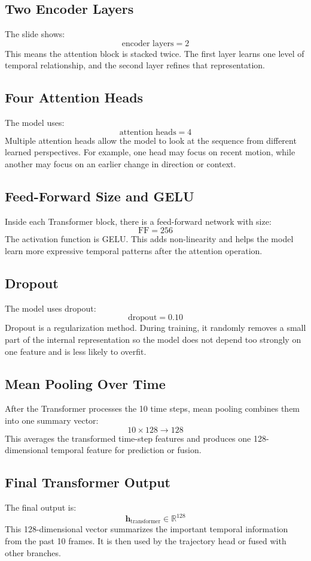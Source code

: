 \documentclass[11pt,a4paper]{article}
\begin{document}
\subsection*{Two Encoder Layers}
The slide shows:
\[
    \text{encoder layers} = 2
\]
This means the attention block is stacked twice. The first layer learns one
level of temporal relationship, and the second layer refines that representation.

\subsection*{Four Attention Heads}
The model uses:
\[
    \text{attention heads} = 4
\]
Multiple attention heads allow the model to look at the sequence from different
learned perspectives. For example, one head may focus on recent motion, while
another may focus on an earlier change in direction or context.

\subsection*{Feed-Forward Size and GELU}
Inside each Transformer block, there is a feed-forward network with size:
\[
    \text{FF} = 256
\]
The activation function is GELU. This adds non-linearity and helps the model
learn more expressive temporal patterns after the attention operation.

\subsection*{Dropout}
The model uses dropout:
\[
    \text{dropout} = 0.10
\]
Dropout is a regularization method. During training, it randomly removes a
small part of the internal representation so the model does not depend too
strongly on one feature and is less likely to overfit.

\subsection*{Mean Pooling Over Time}
After the Transformer processes the 10 time steps, mean pooling combines them
into one summary vector:
\[
    10 \times 128 \rightarrow 128
\]
This averages the transformed time-step features and produces one
128-dimensional temporal feature for prediction or fusion.

\subsection*{Final Transformer Output}
The final output is:
\[
    \mathbf{h}_{\text{transformer}} \in \mathbb{R}^{128}
\]
This 128-dimensional vector summarizes the important temporal information from
the past 10 frames. It is then used by the trajectory head or fused with other
branches.
\end{document}
